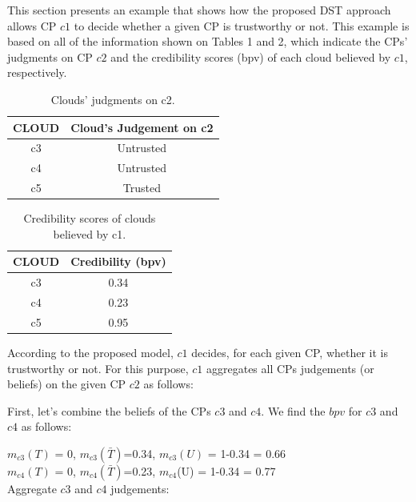 \documentclass[preprint]{elsarticle}
\theoremstyle{definition}
\theoremstyle{remark}
\theoremstyle{property}
\begin{document}
This section presents an example that shows how
the proposed DST approach allows CP $c1$ to decide whether a
given CP is trustworthy or not. This example is based on
all of the information shown on Tables 1 and 2, which indicate the CPs'
judgments on CP $c2$ and the credibility scores (bpv) of
each cloud believed by $c1$, respectively.

\begin{table}[ht]
\caption{Clouds' judgments on c2.}
\centering
\begin{tabular}{|c c|}
\hline
\textbf{CLOUD} & \textbf{Cloud’s Judgement on c2} \\
\hline
c3 & Untrusted \\
c4 & Untrusted \\
c5 & Trusted\\
\hline
\end{tabular}
\end{table}

\begin{table}[ht]
\caption{Credibility scores of clouds believed by c1.}
\centering
\begin{tabular}{|c c|}
\hline
\textbf{CLOUD} & \textbf{Credibility (bpv)} \\
\hline
c3 & 0.34 \\
c4 & 0.23 \\
c5 & 0.95\\
\hline
\end{tabular}
\end{table}

According to the proposed model, $c1$ decides, for
each given CP, whether it is trustworthy or not. For this
purpose, $c1$ aggregates all CPs judgements (or beliefs)
on the given CP $c2$ as follows:

First, let’s combine the beliefs of the CPs $c3$ and
$c4$. We find the $bpv$ for
$c3$ and $c4$ as follows:

$m_{c3}(T)$ = 0, $m_{c3}(\bar{T})$=0.34, $m_{c3}(U)$ = 1-0.34 = 0.66 \\

$m_{c4}(T)$ = 0, $m_{c4}(\bar{T})$=0.23, $m_{c4}$(U) = 1-0.34 = 0.77 \\

Aggregate $c3$ and $c4$ judgements: \\
\end{document}

